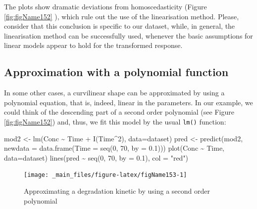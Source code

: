 \documentclass[a4paper,12pt,oneside]{book}
\newenvironment{Shaded}{\begin{snugshade}}{\end{snugshade}}
\newcommand{\DecValTok}[1]{#1}
\newcommand{\FloatTok}[1]{#1}
\newcommand{\SpecialCharTok}[1]{#1}
\newcommand{\StringTok}[1]{#1}
\newcommand{\OtherTok}[1]{#1}
\newcommand{\FunctionTok}[1]{#1}
\newcommand{\AttributeTok}[1]{#1}
\newcommand{\NormalTok}[1]{#1}
\begin{document}
The plots show dramatic deviations from homoscedasticity (Figure \ref{fig:figName152} ), which rule out the use of the linearisation method. Please, consider that this conclusion is specific to our dataset, while, in general, the linearisation method can be successfully used, whenever the basic assumptions for linear models appear to hold for the transformed response.

\hypertarget{approximation-with-a-polynomial-function}{%
\subsection{Approximation with a polynomial function}\label{approximation-with-a-polynomial-function}}

In some other cases, a curvilinear shape can be approximated by using a polynomial equation, that is, indeed, linear in the parameters. In our example, we could think of the descending part of a second order polynomial (see Figure \ref{fig:figName152}) and, thus, we fit this model by the usual \texttt{lm()} function:

\begin{Shaded}
\begin{Highlighting}[]
\NormalTok{mod2 }\OtherTok{\textless{}{-}} \FunctionTok{lm}\NormalTok{(Conc }\SpecialCharTok{\textasciitilde{}}\NormalTok{ Time }\SpecialCharTok{+} \FunctionTok{I}\NormalTok{(Time}\SpecialCharTok{\^{}}\DecValTok{2}\NormalTok{), }\AttributeTok{data=}\NormalTok{dataset)}
\NormalTok{pred }\OtherTok{\textless{}{-}} \FunctionTok{predict}\NormalTok{(mod2, }\AttributeTok{newdata =} \FunctionTok{data.frame}\NormalTok{(}\AttributeTok{Time =} \FunctionTok{seq}\NormalTok{(}\DecValTok{0}\NormalTok{, }\DecValTok{70}\NormalTok{, }\AttributeTok{by =} \FloatTok{0.1}\NormalTok{)))}
\FunctionTok{plot}\NormalTok{(Conc }\SpecialCharTok{\textasciitilde{}}\NormalTok{ Time, }\AttributeTok{data=}\NormalTok{dataset)}
\FunctionTok{lines}\NormalTok{(pred }\SpecialCharTok{\textasciitilde{}} \FunctionTok{seq}\NormalTok{(}\DecValTok{0}\NormalTok{, }\DecValTok{70}\NormalTok{, }\AttributeTok{by =} \FloatTok{0.1}\NormalTok{), }\AttributeTok{col =} \StringTok{"red"}\NormalTok{)}
\end{Highlighting}
\end{Shaded}

\begin{figure}

{\centering \texttt{[image: \_main\_files/figure-latex/figName153-1]} 

}

\caption{Approximating a degradation kinetic by using a second order polynomial}\label{fig:figName153}
\end{figure}
\end{document}
